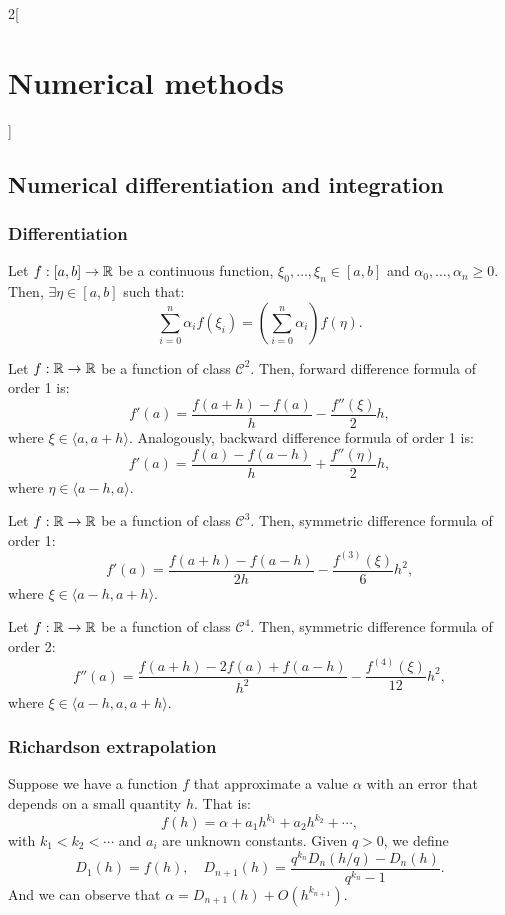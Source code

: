 \documentclass[../../../main.tex]{subfiles}
\begin{document}
\begin{multicols}{2}[\section{Numerical methods}]
\subsection{Numerical differentiation and integration}
\subsubsection*{Differentiation}
\begin{theorem}
Let $f:[a,b]\rightarrow\mathbb{R}$ be a continuous function, $\xi_0,\ldots,\xi_n\in[a,b]$ and $\alpha_0,\ldots,\alpha_n\geq 0$. Then, $\exists\eta\in[a,b]$ such that: $$\sum_{i=0}^n\alpha_if(\xi_i)=\left(\sum_{i=0}^n\alpha_i\right)f(\eta).$$
\end{theorem}
\begin{theorem}
Let $f:\mathbb{R}\rightarrow\mathbb{R}$ be a function of class $\mathcal{C}^2$. Then, forward difference formula of order 1 is: $$f'(a)=\frac{f(a+h)-f(a)}{h}-\frac{f''(\xi)}{2}h,$$ where $\xi\in\langle a,a+h\rangle$. Analogously, backward difference formula of order 1 is: $$f'(a)=\frac{f(a)-f(a-h)}{h}+\frac{f''(\eta)}{2}h,$$ where $\eta\in\langle a-h,a\rangle$.
\end{theorem}
\begin{theorem}
    Let $f:\mathbb{R}\rightarrow\mathbb{R}$ be a function of class $\mathcal{C}^3$. Then, symmetric difference formula of order 1: $$f'(a)=\frac{f(a+h)-f(a-h)}{2h}-\frac{f^{(3)}(\xi)}{6}h^2,$$ where $\xi\in\langle a-h,a+h\rangle$.
\end{theorem}
\begin{theorem}
    Let $f:\mathbb{R}\rightarrow\mathbb{R}$ be a function of class $\mathcal{C}^4$. Then, symmetric difference formula of order 2: $$f''(a)=\frac{f(a+h)-2f(a)+f(a-h)}{h^2}-\frac{f^{(4)}(\xi)}{12}h^2,$$ where $\xi\in\langle a-h,a,a+h\rangle$.
\end{theorem}
\subsubsection*{Richardson extrapolation}
\begin{theorem}
Suppose we have a function $f$ that approximate a value $\alpha$ with an error that depends on a small quantity $h$. That is: $$f(h)=\alpha+a_1h^{k_1}+a_2h^{k_2}+\cdots,$$with $k_1<k_2<\cdots$ and $a_i$ are unknown constants. Given $q>0$, we define $$D_1(h)=f(h),\quad D_{n+1}(h)=\frac{q^{k_n}D_n\left(h/q\right)-D_n(h)}{q^{k_n}-1}.$$ And we can observe that $\alpha=D_{n+1}(h)+O(h^{k_{n+1}})$.
\end{theorem}

\end{multicols}
\end{document}
